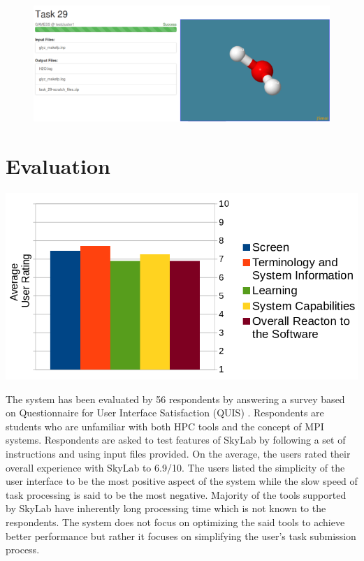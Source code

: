\begin{figure}			
	\includegraphics[scale=0.35]{./images/jsmol_detail_view_2.png}			
\end{figure}	
	
\section{Evaluation}
	\begin{center}			
			\includegraphics[scale=0.32]{./images/uat_graph.png}			
	\end{center}
	The system has been evaluated by 56 respondents by answering a survey based on Questionnaire for User Interface Satisfaction (QUIS) \cite{chin1988development}. Respondents are students who are unfamiliar with both HPC tools and the concept of MPI systems.  Respondents are asked to test features of SkyLab by following a set of instructions and using input files provided. On the average, the users rated their overall experience with SkyLab to 6.9/10. The users listed the simplicity of the user interface to be the most positive aspect of the system while the slow speed of task processing is said to be the most negative. Majority of the tools supported by SkyLab have inherently long processing time which is not known to the respondents. The system does not focus on optimizing the said tools to achieve better performance but rather it focuses on simplifying the user's task submission process. 

